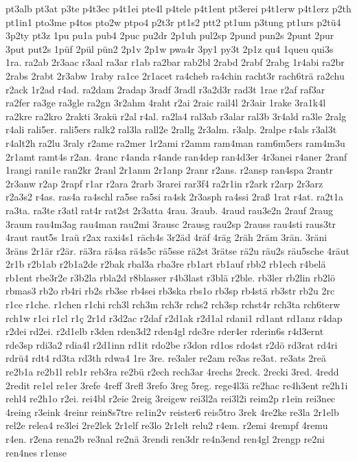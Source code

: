 {pt3alb
pt3at
p3te
p4t3ec
p4t1ei
pte4l
p4tele
p4t1ent
pt3erei
p4t1erw
p4t1erz
p2th
pt1in1
pto3me
p4tos
pto2w
ptpo4
p2t3r
pt1s2
ptt2
pt1um
p3tung
pt1urs
p2tü4
3p2ty
pt3z
1pu
pu1a
pub4
2puc
pu2dr
2p1uh
pul2sp
2pund
pun2s
2punt
2pur
3put
put2s
1püf
2pül
pün2
2p1v
2p1w
pwa4r
3py1
py3t
2p1z
qu4
1queu
qui3s
1ra.
ra2ab
2r3aac
r3aal
ra3ar
r1ab
ra2bar
rab2bl
2rabd
2rabf
2rabg
1r4abi
ra2br
2rabs
2rabt
2r3abw
1raby
ra1ce
2r1acet
ra4cheb
ra4chin
racht3r
rach6trä
ra2chu
r2ack
1r2ad
r4ad.
ra2dam
2radap
3radf
3radl
r3a2d3r
rad3t
1rae
r2af
raf3ar
ra2fer
ra3ge
ra3gle
ra2gn
3r2ahm
4raht
r2ai
2raic
rail4l
2r3air
1rake
3ra1k4l
ra2kre
ra2kro
2rakti
3rakü
r2al
r4al.
ra2la4
ral3ab
r3alar
ral3b
3r4ald
ra3le
2ralg
r4ali
rali5er.
rali5ers
ralk2
ral3la
rall2e
2rallg
2r3alm.
r3alp.
2ralpe
r4als
r3al3t
r4alt2h
ra2lu
3raly
r2ame
ra2mer
1r2ami
r2amm
ram4man
ram6m5ers
ram4m3u
2r1amt
ramt4s
r2an.
4ranc
r4anda
r4ande
ran4dep
ran4d3er
4r3anei
r4aner
2ranf
1rangi
rani1e
ran2kr
2ranl
2r1anm
2r1anp
2ranr
r2ans.
r2ansp
ran4spa
2rantr
2r3anw
r2ap
2rapf
r1ar
r2ara
2rarb
3rarei
rar3f4
ra2r1in
r2ark
r2arp
2r3arz
r2a3s2
r4as.
ras4a
ra4schl
ra5se
ra5si
ra4sk
2r3asph
ra4ssi
2raß
1rat
r4at.
ra2t1a
ra3ta.
ra3te
r3atl
rat4r
rat2st
2r3atta
4rau.
3raub.
4raud
rau3e2n
2rauf
2raug
3raum
rau4m3ag
rau4man
rau2mi
3rausc
2rausg
rau2sp
2rauss
rau4sti
raus3tr
4raut
raut5s
1raü
r2ax
raxi4s1
räch4s
3r2äd
4räf
4räg
2räh
2räm
3rän.
3räni
3räns
2r1är
r2är.
rä3ra
rä4sa
rä4s5c
rä5sse
rä2st
3rätse
rä2u
räu2s
räu5sche
4räut
2r1b
r2b1ab
r2b1a2de
r2bak
rbal3a
rba3re
rb1art
rb1auf
rbb2
rb1ech
r4belä
rb1ent
rbe3r2e
r3b2la
rbla2d
r8blasser
r4b3last
r3blä
r2ble.
rb3ler
rb2lin
rb2lö
rbmas3
rb2o
rb4ri
rb2s
rb3se
rb4sei
rb3ska
rbs1o
rb3sp
rb4stä
rb3str
rb2u
2rc
r1ce
r1che.
r1chen
r1chi
rch3l
rch3m
rch3r
rchs2
rch3sp
rchst4r
rch3ta
rch6terw
rch1w
r1ci
r1cl
r1ç
2r1d
r3d2ac
r2daf
r2d1ak
r2d1al
rdani1
rd1ant
rd1anz
r4dap
r2dei
rd2ei.
r2d1elb
r3den
rden3d2
rden4gl
rde3re
rder4er
rderin6s
r4d3ernt
rde3sp
rdi3a2
rdia4l
r2d1inn
rd1it
rdo2be
r3don
rd1os
rdo4st
r2dö
rd3rat
rd4ri
rdrü4
rdt4
rd3ta
rd3th
rdwa4
1re
3re.
re3aler
re2am
re3as
re3at.
re3ats
2reä
re2b1a
re2b1l
reb1r
reb3ra
re2bü
r2ech
rech3ar
4rechs
2reck.
2recki
3red.
4redd
2redit
re1el
re1er
3refe
4reff
3refl
3refo
3reg
5reg.
rege4l3ä
re2hac
re4h3ent
re2h1i
rehl4
re2h1o
r2ei.
rei4bl
r2eie
2reig
3reigew
rei3l2a
rei3l2i
reim2p
r1ein
rei3nec
4reing
r3eink
4reinr
rein8s7tre
re1in2v
reister6
reis5tro
3rek
4re2ke
re3la
2r1elb
rel2e
relea4
re3lei
2re2lek
2r1elf
re3lo
2r1elt
relu2
r4em.
r2emi
4rempf
4remu
r4en.
r2ena
rena2b
re3nal
re2nä
3rendi
ren3dr
re4n3end
ren4gl
2rengp
re2ni
ren4nes
r1ense
}
